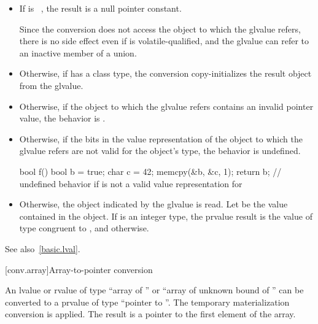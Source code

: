 \begin{itemize}

\item If  is \cv{}~, the result is a
null pointer constant.
\begin{note}
Since the conversion does not access the object to which the glvalue refers,
there is no side effect even if  is volatile-qualified, and
the glvalue can refer to an inactive member of a union.
\end{note}

\item Otherwise, if  has a class
type, the conversion copy-initializes the result object from
the glvalue.

\item Otherwise, if the object to which the glvalue refers contains an invalid
pointer value, the behavior is
.

\item Otherwise, if the bits in the value representation of
the object to which the glvalue refers
are not valid for the object's type, the behavior is undefined.
\begin{example}
\begin{codeblock}
bool f() {
  bool b = true;
  char c = 42;
  memcpy(&b, &c, 1);
  return b;         // undefined behavior if  is not a valid value representation for 
}
\end{codeblock}
\end{example}

\item Otherwise, the object indicated by the glvalue is read.
Let  be the value contained in the object.
If  is an integer type,
the prvalue result is
the value of type  congruent to , and
 otherwise.
\end{itemize}

\pnum
\begin{note}
See also~\ref{basic.lval}.
\end{note}

[conv.array]{Array-to-pointer conversion}

\pnum
{}%
%
%
An lvalue or rvalue of type ``array of  '' or ``array
of unknown bound of '' can be converted to a prvalue of type
``pointer to ''.
The temporary materialization conversion is applied.
The result is a pointer to the first element of the array.

